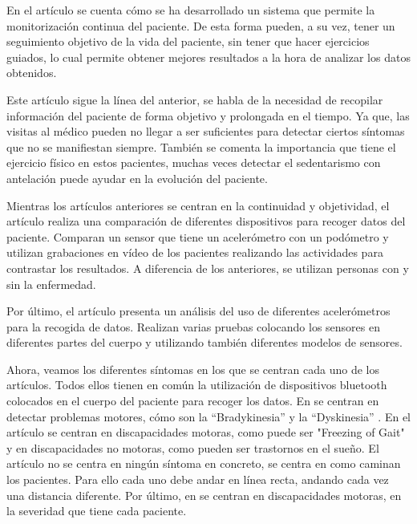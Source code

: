 \documentclass[11pt,spanish]{article}
\begin{document}
En el artículo \cite{resumen1} se cuenta cómo se ha desarrollado un sistema que permite la monitorización continua del paciente. De esta forma pueden, a su vez, tener un seguimiento objetivo de la vida del paciente, sin tener que hacer ejercicios guiados, lo cual permite obtener mejores resultados a la hora de analizar los datos obtenidos. 
\newline

Este artículo \cite{resumen2} sigue la línea del anterior, se habla de la necesidad de recopilar información del paciente de forma objetivo y prolongada en el tiempo. Ya que, las visitas al médico pueden no llegar a ser suficientes para detectar ciertos síntomas que no se manifiestan siempre. También se comenta la importancia que tiene el ejercicio físico en estos pacientes, muchas veces detectar el sedentarismo con antelación puede ayudar en la evolución del paciente.
\newline

Mientras los artículos anteriores se centran en la continuidad y objetividad, el artículo \cite{resumen3} realiza una comparación de diferentes dispositivos para recoger datos del paciente. Comparan un sensor que tiene un acelerómetro con un podómetro y utilizan grabaciones en vídeo de los pacientes realizando las actividades para contrastar los resultados. A diferencia de los anteriores, se utilizan personas con y sin la enfermedad.
\newline

Por último, el artículo \cite{resumen4} presenta un análisis del uso de diferentes acelerómetros para la recogida de datos. Realizan varias pruebas colocando los sensores en diferentes partes del cuerpo y utilizando también diferentes modelos de sensores.
\newline

Ahora, veamos los diferentes síntomas en los que se centran cada uno de los artículos. Todos ellos tienen en común la utilización de dispositivos bluetooth colocados en el cuerpo del paciente para recoger los datos. En \cite{resumen1} se centran en detectar problemas motores, cómo son la “Bradykinesia” \cite{Hipocinesia} y la “Dyskinesia” \cite{Dyskinesia}. En el artículo \cite{resumen2} se centran en discapacidades motoras, como puede ser "Freezing of Gait" \cite{Gait} y en discapacidades no motoras, como pueden ser trastornos en el sueño. El artículo \cite{resumen3} no se centra en ningún síntoma en concreto, se centra en como caminan los pacientes. Para ello cada uno debe andar en línea recta, andando cada vez una distancia diferente. Por último, en \cite{resumen4} se centran en discapacidades motoras, en la severidad que tiene cada paciente.
\newline
\end{document}
